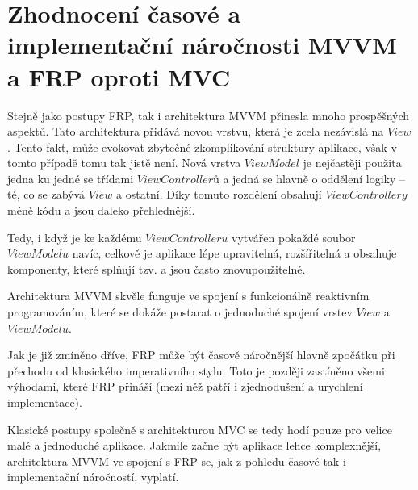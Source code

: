 \documentclass[thesis=M,czech]{FITthesis}[2012/06/26]
\begin{document}
\section{Zhodnocení časové a implementační náročnosti MVVM a FRP oproti MVC}
Stejně jako postupy FRP, tak i architektura MVVM přinesla mnoho prospěšných aspektů. Tato architektura přidává novou vrstvu, která je zcela nezávislá na $View$. Tento fakt, může evokovat zbytečné zkomplikování struktury aplikace, však v tomto případě tomu tak jistě není. Nová vrstva $ViewModel$ je nejčastěji použita jedna ku jedné se třídami $ViewControllerů$ a jedná se hlavně o oddělení logiky -- té, co se zabývá $View$ a ostatní. Díky tomuto rozdělení obsahují $ViewControllery$ méně kódu a jsou daleko přehlednější.

Tedy, i když je ke každému $ViewControlleru$ vytvářen pokaždé soubor $ViewModelu$ navíc, celkově je aplikace lépe upravitelná, rozšířitelná a obsahuje komponenty, které splňují tzv.  a jsou často znovupoužitelné.

Architektura MVVM skvěle funguje ve spojení s funkcionálně reaktivním programováním, které se dokáže postarat o jednoduché spojení vrstev $View$ a $ViewModelu$.

Jak je již zmíněno dříve, FRP může být časově náročnější hlavně zpočátku při přechodu od klasického imperativního stylu. Toto je později zastíněno všemi výhodami, které FRP přináší (mezi něž patří i zjednodušení a urychlení implementace).

Klasické postupy společně s architekturou MVC se tedy hodí pouze pro velice malé a jednoduché aplikace. Jakmile začne být aplikace lehce komplexnější, architektura MVVM ve spojení s FRP se, jak z pohledu časové tak i implementační náročností, vyplatí.

\begin{conclusion}

\end{conclusion}




\appendix
\end{document}
